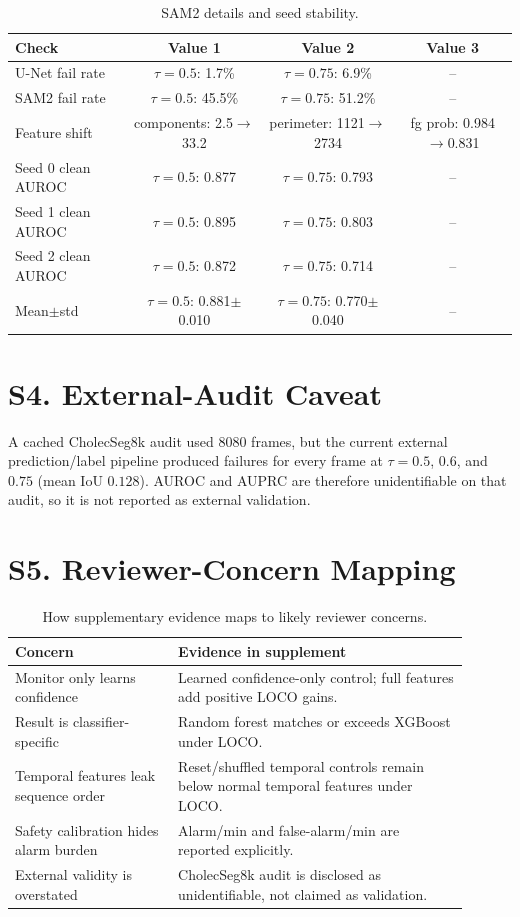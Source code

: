 \documentclass[9pt]{article}
\newcommand{\unet}{U-Net}
\begin{document}
\begin{table}[h]
\centering
\scriptsize
\setlength{\tabcolsep}{4pt}
\caption{SAM2 details and seed stability.}
\label{tab:supp_sam2_seed}
\begin{tabular}{lccc}
\toprule
Check & Value 1 & Value 2 & Value 3 \\
\midrule
\unet{} fail rate & $\tau=0.5$: 1.7\% & $\tau=0.75$: 6.9\% & -- \\
SAM2 fail rate & $\tau=0.5$: 45.5\% & $\tau=0.75$: 51.2\% & -- \\
Feature shift & components: 2.5$\rightarrow$33.2 & perimeter: 1121$\rightarrow$2734 & fg prob: 0.984$\rightarrow$0.831 \\
Seed 0 clean AUROC & $\tau=0.5$: 0.877 & $\tau=0.75$: 0.793 & -- \\
Seed 1 clean AUROC & $\tau=0.5$: 0.895 & $\tau=0.75$: 0.803 & -- \\
Seed 2 clean AUROC & $\tau=0.5$: 0.872 & $\tau=0.75$: 0.714 & -- \\
Mean$\pm$std & $\tau=0.5$: 0.881$\pm$0.010 & $\tau=0.75$: 0.770$\pm$0.040 & -- \\
\bottomrule
\end{tabular}
\end{table}

\section*{S4. External-Audit Caveat}

A cached CholecSeg8k audit used 8080 frames, but the current external
prediction/label pipeline produced failures for every frame at $\tau=0.5$,
$0.6$, and $0.75$ (mean IoU $0.128$). AUROC and AUPRC are therefore
unidentifiable on that audit, so it is not reported as external validation.

\section*{S5. Reviewer-Concern Mapping}

\begin{table}[h]
\centering
\scriptsize
\setlength{\tabcolsep}{4pt}
\caption{How supplementary evidence maps to likely reviewer concerns.}
\begin{tabular}{p{0.32\linewidth}p{0.58\linewidth}}
\toprule
Concern & Evidence in supplement \\
\midrule
Monitor only learns confidence & Learned confidence-only control; full features add positive LOCO gains. \\
Result is classifier-specific & Random forest matches or exceeds XGBoost under LOCO. \\
Temporal features leak sequence order & Reset/shuffled temporal controls remain below normal temporal features under LOCO. \\
Safety calibration hides alarm burden & Alarm/min and false-alarm/min are reported explicitly. \\
External validity is overstated & CholecSeg8k audit is disclosed as unidentifiable, not claimed as validation. \\
\bottomrule
\end{tabular}
\end{table}
\end{document}
